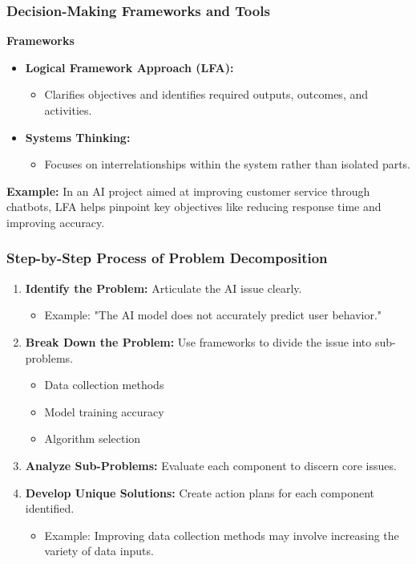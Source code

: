 \documentclass[aspectratio=169]{beamer}
\begin{document}
\begin{frame}[fragile]
    \frametitle{Decision-Making Frameworks and Tools}
    
    \textbf{Frameworks}
    \begin{itemize}
        \item \textbf{Logical Framework Approach (LFA):} 
        \begin{itemize}
            \item Clarifies objectives and identifies required outputs, outcomes, and activities.
        \end{itemize}
        
        \item \textbf{Systems Thinking:} 
        \begin{itemize}
            \item Focuses on interrelationships within the system rather than isolated parts.
        \end{itemize}
    \end{itemize}
    
    \textbf{Example:} In an AI project aimed at improving customer service through chatbots, LFA helps pinpoint key objectives like reducing response time and improving accuracy.
\end{frame}

\begin{frame}[fragile]
    \frametitle{Step-by-Step Process of Problem Decomposition}
    
    \begin{enumerate}
        \item \textbf{Identify the Problem:} Articulate the AI issue clearly.
            \begin{itemize}
                \item Example: "The AI model does not accurately predict user behavior."
            \end{itemize}
        \item \textbf{Break Down the Problem:} Use frameworks to divide the issue into sub-problems.
            \begin{itemize}
                \item Data collection methods
                \item Model training accuracy
                \item Algorithm selection
            \end{itemize}
        \item \textbf{Analyze Sub-Problems:} Evaluate each component to discern core issues.
        \item \textbf{Develop Unique Solutions:} Create action plans for each component identified.
            \begin{itemize}
                \item Example: Improving data collection methods may involve increasing the variety of data inputs.
            \end{itemize}
    \end{enumerate}
\end{frame}
\end{document}
